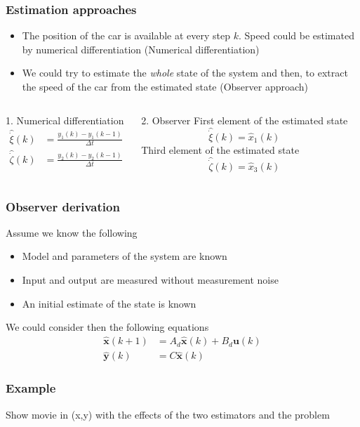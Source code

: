 \begin{frame}
    \frametitle{Estimation approaches}
    \begin{itemize}
        \item The position of the car is available at every step $k$. Speed could be estimated by numerical differentiation (Numerical differentiation)
        \item We could try to estimate the \emph{whole} state of the system and then, to extract the speed of the car from the estimated state (Observer approach)
    \end{itemize}
     \begin{columns}[t]
        \begin{block}{1. Numerical differentiation}
            \vspace*{-1em}
            \begin{align*}
            \hat{\dot{\xi}}(k)& = \frac{y_1(k) - y_1(k-1)}{\Delta t}\\
            \hat{\dot{\zeta}}(k)& = \frac{y_2(k) - y_2(k-1)}{\Delta t}
            \end{align*}
        \end{block}
        \begin{block}{2. Observer}
            First element of the estimated state
            $$\hat{\dot{\xi}}(k)= \hat{x}_1(k)$$
            Third element of the estimated state
            $$\hat{\dot{\zeta}}(k)=\hat{x}_3(k)$$
        \end{block}	
    \end{columns} 
\end{frame}

\begin{frame}
    \frametitle{Observer derivation}
    Assume we know the following
    \begin{itemize}
        \item Model and parameters of the system are known
        \item Input and output are measured without measurement noise
        \item An initial estimate of the state is known
    \end{itemize}
    We could consider then the following equations
    \begin{align*}
    \hat{\bm{x}}(k+1) &= A_d \hat{\bm{x}}(k) + B_d \bm{u}(k)\\
    \hat{\bm{y}}(k) &= C\hat{\bm{x}}(k) 
    \end{align*}
    
\end{frame}
\begin{frame}
	\frametitle{Example}
	Show movie in (x,y) with the effects of the two estimators and the problem 
\end{frame}

